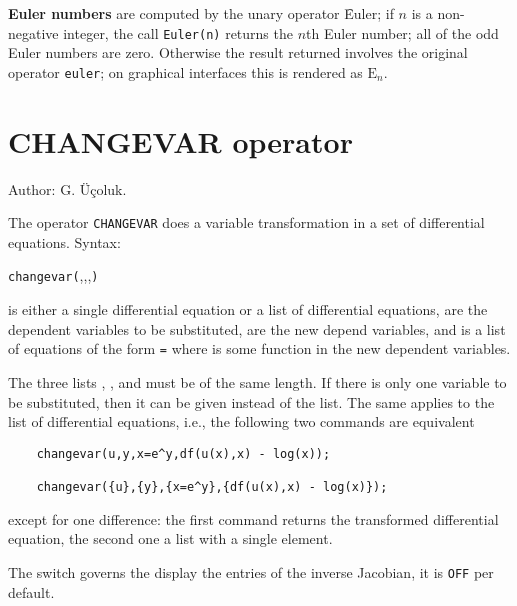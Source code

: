 \hypertarget{operator:EULER}{}
\textbf{Euler numbers} are computed by the unary operator \f{Euler}; if $n$
is a non-negative integer, the call \texttt{Euler(n)} returns the $n$th
Euler number; all of the odd Euler numbers are zero. 
Otherwise the result returned involves the original operator \texttt{euler};
on graphical interfaces this is rendered
as $\mathrm{E}_n$.

\section{CHANGEVAR operator}
\hypertarget{operator:CHANGEVAR}{}

\noindent
Author: G. \"{U}\c{c}oluk.

The operator \texttt{CHANGEVAR} does a variable transformation in a set of 
differential equations.
Syntax:
\begin{syntaxtable}
   \texttt{changevar(},,,\texttt{)}
\end{syntaxtable}
 is either a single differential equation or a list of
differential equations,  are the dependent variables to
be substituted,  are the new depend variables, and
 is a list of equations of the form 
\texttt{=}  where  is some function
in the new dependent variables.

The three lists , , and  must
be of the same length. If there is only one variable to be
substituted, then it can be given instead of the list. The same applies to the list
of differential equations, i.e., the following two
commands are equivalent
\begin{verbatim}
    changevar(u,y,x=e^y,df(u(x),x) - log(x));

    changevar({u},{y},{x=e^y},{df(u(x),x) - log(x)});
\end{verbatim}
except for one difference: the first command returns the transformed differential
equation, the second one a list with a single element.

\hypertarget{switch:DISPJACOBIAN}{}
The switch  governs the display the entries of the inverse Jacobian,
it is \texttt{OFF} per default.

